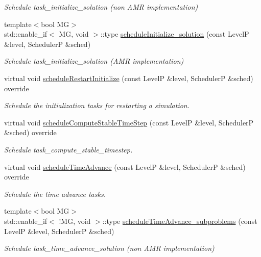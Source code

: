 \begin{DoxyCompactItemize}
\begin{DoxyCompactList}\small\item\em Schedule task\+\_\+initialize\+\_\+solution (non A\+MR implementation) \end{DoxyCompactList}\item 
{\footnotesize template$<$bool MG$>$ }\\std\+::enable\+\_\+if$<$ MG, void $>$\+::type \hyperlink{classUintah_1_1PhaseField_1_1Heat_a0ee0e3cbb32c28fd0cb4b567cb0dbd9b}{schedule\+Initialize\+\_\+solution} (const LevelP \&level, SchedulerP \&sched)
\begin{DoxyCompactList}\small\item\em Schedule task\+\_\+initialize\+\_\+solution (A\+MR implementation) \end{DoxyCompactList}\item 
virtual void \hyperlink{classUintah_1_1PhaseField_1_1Heat_aa0d1d051f38540745482f7f3b0888d33}{schedule\+Restart\+Initialize} (const LevelP \&level, SchedulerP \&sched) override
\begin{DoxyCompactList}\small\item\em Schedule the initialization tasks for restarting a simulation. \end{DoxyCompactList}\item 
virtual void \hyperlink{classUintah_1_1PhaseField_1_1Heat_a849225b20f1e31b74339046b9ba2d937}{schedule\+Compute\+Stable\+Time\+Step} (const LevelP \&level, SchedulerP \&sched) override
\begin{DoxyCompactList}\small\item\em Schedule task\+\_\+compute\+\_\+stable\+\_\+timestep. \end{DoxyCompactList}\item 
virtual void \hyperlink{classUintah_1_1PhaseField_1_1Heat_a700f9df2ccf60f560f776dc95ef4883e}{schedule\+Time\+Advance} (const LevelP \&level, SchedulerP \&sched) override
\begin{DoxyCompactList}\small\item\em Schedule the time advance tasks. \end{DoxyCompactList}\item 
{\footnotesize template$<$bool MG$>$ }\\std\+::enable\+\_\+if$<$ !MG, void $>$\+::type \hyperlink{classUintah_1_1PhaseField_1_1Heat_a7daf1da9106d539e50121297c5ecf0b3}{schedule\+Time\+Advance\+\_\+subproblems} (const LevelP \&level, SchedulerP \&sched)
\begin{DoxyCompactList}\small\item\em Schedule task\+\_\+time\+\_\+advance\+\_\+solution (non A\+MR implementation) \end{DoxyCompactList}\item 

\end{DoxyCompactItemize}
